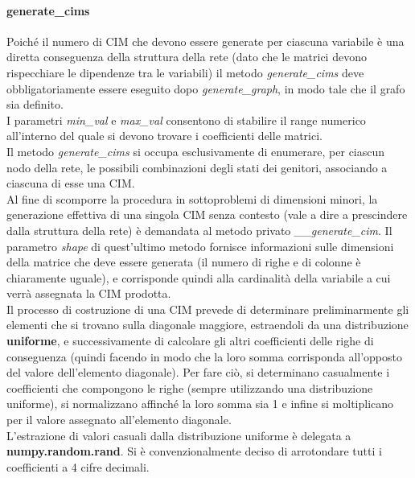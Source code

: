   \paragraph{generate\_cims}
  Poiché il numero di CIM che devono essere generate per ciascuna variabile è una diretta conseguenza della struttura della rete
  (dato che le matrici devono rispecchiare le dipendenze tra le variabili) il metodo \textit{generate\_cims} deve obbligatoriamente 
  essere eseguito dopo \textit{generate\_graph}, in modo tale che il grafo sia definito.\\
  I parametri \textit{min\_val} e \textit{max\_val} consentono di stabilire il range numerico all'interno del quale
  si devono trovare i coefficienti delle matrici.\\
  Il metodo \textit{generate\_cims} si occupa esclusivamente di enumerare, per ciascun nodo della rete, le possibili combinazioni
  degli stati dei genitori, associando a ciascuna di esse una CIM.\\
  Al fine di scomporre la procedura in sottoproblemi di dimensioni minori, la generazione effettiva di una singola CIM senza contesto
  (vale a dire a prescindere dalla struttura della rete) è demandata al metodo privato \textit{\_\_generate\_cim}.
  Il parametro \textit{shape} di quest'ultimo metodo fornisce informazioni sulle dimensioni della matrice che
  deve essere generata (il numero di righe e di colonne è chiaramente uguale), e corrisponde quindi
  alla cardinalità della variabile a cui verrà assegnata la CIM prodotta.\\
  Il processo di costruzione di una CIM prevede di determinare preliminarmente gli elementi che si trovano 
  sulla diagonale maggiore, estraendoli da una distribuzione \textbf{uniforme}, e successivamente di calcolare
  gli altri coefficienti delle righe di conseguenza (quindi facendo in modo che la loro somma corrisponda all'opposto
  del valore dell'elemento diagonale). Per fare ciò, si determinano casualmente i coefficienti che compongono
  le righe (sempre utilizzando una distribuzione uniforme), si normalizzano affinché la loro somma sia 1 e infine
  si moltiplicano per il valore assegnato all'elemento diagonale.\\
  L'estrazione di valori casuali dalla distribuzione uniforme è delegata a \textbf{numpy.random.rand}.
  Si è convenzionalmente deciso di arrotondare tutti i coefficienti a 4 cifre decimali.

